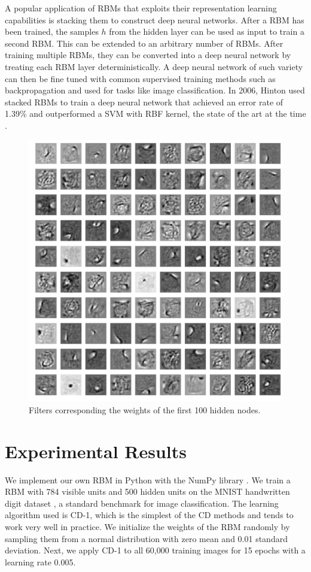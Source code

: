 \documentclass[journal]{IEEEtran}
\begin{document}
A popular application of RBMs that exploits their representation learning capabilities is stacking them to construct deep neural networks. After a RBM has been trained, the samples $h$ from the hidden layer can be used as input to train a second RBM. This can be extended to an arbitrary number of RBMs. After training multiple RBMs, they can be converted into a deep neural network by treating each RBM layer deterministically. A deep neural network of such variety can then be fine tuned with common supervised training methods such as backpropagation \cite{hinton2006reducing} and used for tasks like image classification. In 2006, Hinton used stacked RBMs to train a deep neural network that achieved an error rate of 1.39\% and outperformed a SVM with RBF kernel, the state of the art at the time \cite{hinton2006fast}.

\begin{figure}[h]
  \centering
  \includegraphics[width=0.9\linewidth]{filters.png}
  \caption{Filters corresponding the weights of the first 100 hidden nodes.}
  \label{filters}
\end{figure}

\section{Experimental Results}
We implement our own RBM in Python with the NumPy library \cite{oliphant2006guide}. We train a RBM with 784 visible units and 500 hidden units on the MNIST handwritten digit dataset \cite{deng2012mnist}, a standard benchmark for image classification. The learning algorithm used is CD-1, which is the simplest of the CD methods and tends to work very well in practice. We initialize the weights of the RBM randomly by sampling them from a normal distribution with zero mean and 0.01 standard deviation. Next, we apply CD-1 to all 60,000 training images for 15 epochs with a learning rate 0.005.
\end{document}
